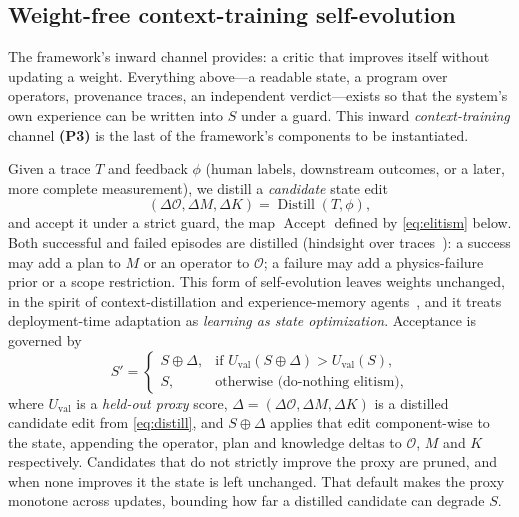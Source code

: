 \subsection{Weight-free context-training self-evolution}
\label{sec:selfevolve}

The framework's inward channel provides: a critic that improves itself without
updating a weight. Everything above---a readable state, a program over
operators, provenance traces, an independent verdict---exists so that the
system's own experience can be written into $S$ under a guard. This inward \emph{context-training} channel
\textbf{(P3)} is the last of the framework's components to be instantiated.

Given a trace $T$ and feedback $\phi$ (human labels, downstream outcomes, or a
later, more complete measurement), we distill a \emph{candidate} state edit
\begin{equation}
  (\Delta\mathcal{O}, \Delta M, \Delta K) = \operatorname{Distill}(T, \phi), \label{eq:distill}
\end{equation}
and accept it under a strict guard, the map $\operatorname{Accept}$ defined by \eqref{eq:elitism}
below. Both successful and failed episodes are distilled (hindsight over
traces~\cite{hindsight2026,reasoningbank2026}): a success may add a plan to $M$ or
an operator to $\mathcal{O}$; a failure may add a physics-failure prior or a scope restriction.
This form of self-evolution leaves weights unchanged, in the spirit of
context-distillation and experience-memory
agents~\cite{contexttraining2026,reasoningbank2026,reflexion2023,explicitmem2026,%
amem2025,agentmemsurvey2024,vilomem2026}, and it treats deployment-time adaptation
as \emph{learning as state optimization}. Acceptance is governed by
\begin{equation}
  S' =
  \begin{cases}
    S \oplus \Delta, & \text{if } U_{\mathrm{val}}(S\oplus\Delta) > U_{\mathrm{val}}(S),\\[2pt]
    S, & \text{otherwise (do-nothing elitism),}
  \end{cases}
  \label{eq:elitism}
\end{equation}
where $U_{\mathrm{val}}$ is a \emph{held-out proxy} score, $\Delta=(\Delta\mathcal{O},\Delta M,\Delta K)$
is a distilled candidate edit from \eqref{eq:distill}, and $S\oplus\Delta$ applies that edit
component-wise to the state, appending the operator, plan and knowledge deltas to
$\mathcal{O}$, $M$ and $K$ respectively. Candidates that do not strictly improve the proxy are
pruned, and when none improves it the state is left unchanged. That default makes the proxy
monotone across updates, bounding how far a distilled candidate can degrade $S$.

